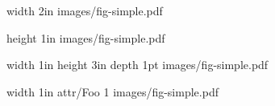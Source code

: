 
\pdfximage width 2in {images/fig-simple.pdf}\pdfrefximage\pdflastximage\par
\pdfximage height 1in {images/fig-simple.pdf}\pdfrefximage\pdflastximage\par
\pdfximage width 1in height 3in depth 1pt {images/fig-simple.pdf}\pdfrefximage\pdflastximage\par
{}\pdfrefximage\pdflastximage\par
{} \pdfrefximage\pdflastximage\par
\pdfximage width 1in attr{/Foo 1} {images/fig-simple.pdf}\pdfrefximage\pdflastximage\par
\bye
